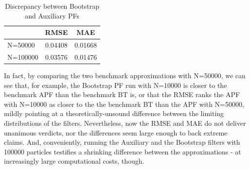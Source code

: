 \documentclass[
]{book}
\theoremstyle{break}
\theoremstyle{nonumberplain}
\begin{document}
\begin{longtable}[t]{lcc}
\caption{\label{tab:unnamed-chunk-40}Discrepancy between Bootstrap and Auxiliary PFs}\\
\toprule
  & RMSE & MAE\\
\midrule
N=50000 & 0.04408 & 0.01668\\
N=100000 & 0.03576 & 0.01476\\
\bottomrule
\end{longtable}

In fact, by comparing the two benchmark approximations with N=50000, we
can see that, for example, the Bootstrap PF run with N=10000 is closer
to the benchmark APF than the benchmark BT is, or that the RMSE ranks
the APF with N=10000 as closer to the the benchmark BT than the APF with
N=50000, mildly pointing at a theoretically-unsound difference between
the limiting distributions of the filters. Nevertheless, now the RMSE
and MAE do not deliver unanimous verdicts, nor the differences seem
large enough to back extreme claims. And, conveniently, running the
Auxiliary and the Bootstrap filters with 100000 particles testifies a
shrinking difference between the approximations - at increasingly large
computational costs, though.\\
\end{document}
